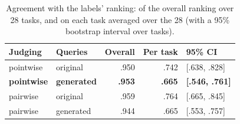 \begin{table}[t]
\centering\small
\setlength{\tabcolsep}{5pt}
\begin{tabular}{llrrl}
\toprule
\textbf{Judging} & \textbf{Queries} & \textbf{Overall} & \textbf{Per task} & \textbf{95\% CI} \\
\midrule
pointwise & original & .950 & .742 & [.638, .828] \\
\textbf{pointwise} & \textbf{generated} & \textbf{.953} & \textbf{.665} & \textbf{[.546, .761]} \\
\midrule
pairwise & original & .959 & .764 & [.665, .845] \\
pairwise & generated & .944 & .665 & [.553, .757] \\
\bottomrule
\end{tabular}
\caption{Agreement with the labels' ranking: of the overall ranking over 28 tasks, and on each task averaged over the 28 (with a 95\% bootstrap interval over tasks).}
\label{tab:main_table}
\end{table}
